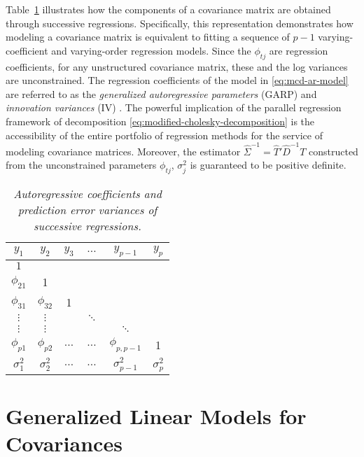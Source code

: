Table~\ref{table:cholesky-decomposition-successive-regressions} illustrates how the components of a covariance matrix are obtained through successive regressions. Specifically, this representation demonstrates how modeling a covariance matrix is equivalent to fitting a sequence of $p - 1$ varying-coefficient and varying-order regression models. Since the $\phi_{tj}$ are regression coefficients, for any unstructured covariance matrix, these and the log variances are unconstrained. The regression coefficients of the model in \eqref{eq:mcd-ar-model} are referred to as the \textit{generalized autoregressive parameters} (GARP) and \textit{innovation variances} (IV) \citep{pourahmadi1999joint,pourahmadi2000maximum}. The powerful implication of the parallel regression framework of decomposition \eqref{eq:modified-cholesky-decomposition} is the accessibility of the entire portfolio of regression methods for the service of modeling covariance matrices. Moreover, the estimator $\hat{\Sigma}^{-1} = \hat{T}' \hat{D}^{-1} {T}$ constructed from the unconstrained parameters $\phi_{tj}$, $\sigma_j^2$ is guaranteed to be positive definite. 
\bigskip

\begin{table}[H]
\centering
\caption{\textit{Autoregressive coefficients and prediction error variances of successive regressions.}}
\begin{tabular}{cccccc}
 $y_{1}$&$y_{2}$ & $y_{3}$ & $\dots$ &$y_{p-1}$& $y_{p}$\\ \midrule
 $1$& &&&&\\
$\phi_{21}$& 1 &&&& \\
$\phi_{31}$& $\phi_{32}$& 1 &&& \\ 
$\vdots$ & $\vdots$ & & $\ddots$&& \\
$\vdots$ & $\vdots$ & && $\ddots$& \\
$\phi_{p1}$& $\phi_{p2}$&$\dots$ &$\dots$ &$\phi_{p,p-1}$ & 1\\ \midrule
$\sigma_1^2$ & $\sigma_2^2$ & $\dots$&$\dots$ &$\sigma_{p-1}^2$ &$\sigma_p^2$
\end{tabular} \label{table:cholesky-decomposition-successive-regressions}
\end{table}

\section{Generalized Linear Models for Covariances} \label{covariance-glms}


